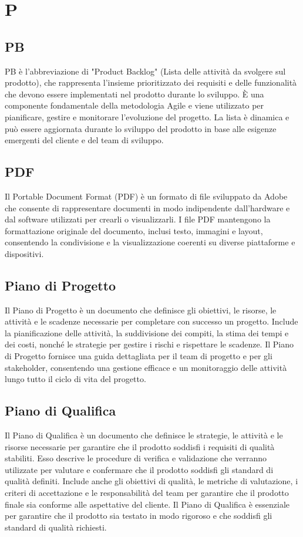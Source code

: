 \section{P} 
\subsection{PB} 
PB è l'abbreviazione di "Product Backlog" (Lista delle attività da svolgere sul prodotto), che rappresenta l'insieme prioritizzato dei requisiti e delle funzionalità che devono essere implementati nel prodotto durante lo sviluppo. È una componente fondamentale della metodologia Agile e viene utilizzato per pianificare, gestire e monitorare l'evoluzione del progetto. La lista è dinamica e può essere aggiornata durante lo sviluppo del prodotto in base alle esigenze emergenti del cliente e del team di sviluppo. 
\subsection{PDF} 
Il Portable Document Format (PDF) è un formato di file sviluppato da Adobe che consente di rappresentare documenti in modo indipendente dall'hardware e dal software utilizzati per crearli o visualizzarli. I file PDF mantengono la formattazione originale del documento, inclusi testo, immagini e layout, consentendo la condivisione e la visualizzazione coerenti su diverse piattaforme e dispositivi. 
\subsection{Piano di Progetto} 
Il Piano di Progetto è un documento che definisce gli obiettivi, le risorse, le attività e le scadenze necessarie per completare con successo un progetto. Include la pianificazione delle attività, la suddivisione dei compiti, la stima dei tempi e dei costi, nonché le strategie per gestire i rischi e rispettare le scadenze. Il Piano di Progetto fornisce una guida dettagliata per il team di progetto e per gli stakeholder, consentendo una gestione efficace e un monitoraggio delle attività lungo tutto il ciclo di vita del progetto. 
\subsection{Piano di Qualifica} 
Il Piano di Qualifica è un documento che definisce le strategie, le attività e le risorse necessarie per garantire che il prodotto soddisfi i requisiti di qualità stabiliti. Esso descrive le procedure di verifica e validazione che verranno utilizzate per valutare e confermare che il prodotto soddisfi gli standard di qualità definiti. Include anche gli obiettivi di qualità, le metriche di valutazione, i criteri di accettazione e le responsabilità del team per garantire che il prodotto finale sia conforme alle aspettative del cliente. Il Piano di Qualifica è essenziale per garantire che il prodotto sia testato in modo rigoroso e che soddisfi gli standard di qualità richiesti. 
